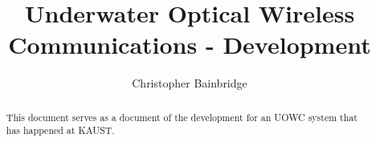 \documentclass{article}
\author{Christopher Bainbridge}
\title{Underwater Optical Wireless Communications - Development}
\begin{document}
\maketitle

\begin{abstract}
This document serves as a document of the development for an \ac{UOWC} system
that has happened at \ac{KAUST}.
\end{abstract}







\end{document}
